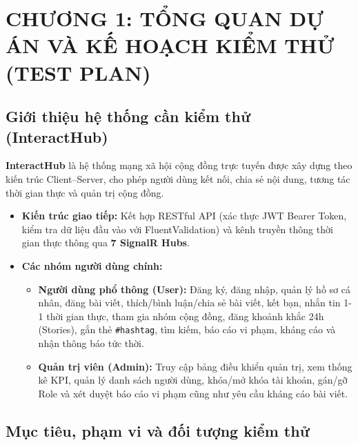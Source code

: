 \documentclass[11pt,a4paper]{article}
\begin{document}
\tableofcontents
\pagebreak

\section{CHƯƠNG 1: TỔNG QUAN DỰ ÁN VÀ KẾ HOẠCH KIỂM THỬ (TEST PLAN)}

\subsection{Giới thiệu hệ thống cần kiểm thử (InteractHub)}
\begin{tcolorbox}[colback=boxbg, colframe=boxborder, title=\textbf{Tổng quan nền tảng InteractHub}, coltitle=darkblue, fonttitle=\bfseries]
\textbf{InteractHub} là hệ thống mạng xã hội cộng đồng trực tuyến được xây dựng theo kiến trúc Client--Server, cho phép người dùng kết nối, chia sẻ nội dung, tương tác thời gian thực và quản trị cộng đồng.
\end{tcolorbox}

\begin{itemize}[leftmargin=1.2cm, noitemsep]
    \item[\textbf{--}] \textbf{Kiến trúc giao tiếp:} Kết hợp RESTful API (xác thực JWT Bearer Token, kiểm tra dữ liệu đầu vào với FluentValidation) và kênh truyền thông thời gian thực thông qua \textbf{7 SignalR Hubs}.
    \item[\textbf{--}] \textbf{Các nhóm người dùng chính:}
    \begin{itemize}[leftmargin=0.8cm, label=$\bullet$, noitemsep]
        \item \textbf{Người dùng phổ thông (User):} Đăng ký, đăng nhập, quản lý hồ sơ cá nhân, đăng bài viết, thích/bình luận/chia sẻ bài viết, kết bạn, nhắn tin 1-1 thời gian thực, tham gia nhóm cộng đồng, đăng khoảnh khắc 24h (Stories), gắn thẻ \texttt{\#hashtag}, tìm kiếm, báo cáo vi phạm, kháng cáo và nhận thông báo tức thời.
        \item \textbf{Quản trị viên (Admin):} Truy cập bảng điều khiển quản trị, xem thống kê KPI, quản lý danh sách người dùng, khóa/mở khóa tài khoản, gán/gỡ Role và xét duyệt báo cáo vi phạm cũng như yêu cầu kháng cáo bài viết.
    \end{itemize}
\end{itemize}

\subsection{Mục tiêu, phạm vi và đối tượng kiểm thử}
\end{document}
